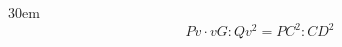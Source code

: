 \documentclass[border=4pt]{standalone}
\begin{document}
\begin{varwidth}{30em}
\large
\[ Pv \cdot vG : Qv^2 = PC^2 : CD^2 \]

\end{varwidth}
\end{document}
